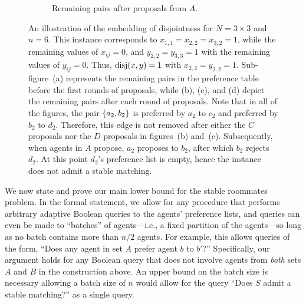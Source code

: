 \begin{figure}[p]
\begin{subfigure}{0.45\textwidth}
\begin{center}
\begin{tikzpicture}
            \end{tikzpicture}
        \end{center}
        \caption{Remaining pairs after proposals from $A$.}
    \end{subfigure}
    \caption{An illustration of the embedding of disjointness for $N = 3 \times 3$ and $n = 6$. This instance corresponds to $x_{1,1} = x_{2,2} = x_{3, 2} = 1$, while the remaining values of $x_{ij} = 0$, and $y_{2,2} = y_{3,3} = 1$ with the remaining values of $y_{ij} = 0$. Thus, $\disj(x, y) = 1$ with $x_{2,2} = y_{2,2} = 1$. Sub-figure~(a) represents the remaining pairs in the preference table before the first rounds of proposals, while (b), (c), and (d) depict the remaining pairs after each round of proposals. Note that in all of the figures, the pair $\set{a_2, b_2}$ is preferred by $a_2$ to $c_2$ and preferred by $b_2$ to $d_2$. Therefore, this edge is not removed after either the $C$ proposals nor the $D$ proposals in figures~(b) and~(c). Subsequently, when agents in $A$ propose, $a_2$ proposes to $b_2$, after which $b_2$ rejects $d_2$. At this point $d_2$'s preference list is empty, hence the instance does not admit a stable matching.}
    \label{fig:intersecting}
\end{figure}


We now state and prove our main lower bound for the stable roommates problem. In the formal statement, we allow for any procedure that performs arbitrary adaptive Boolean queries to the agents' preference lists, and queries can even be made to ``batches'' of agents---i.e., a fixed partition of the agents---so long as no batch contains more than $n/2$ agents. For example, this allows queries of the form, ``Does any agent in set $A$ prefer agent $b$ to $b'$?'' Specifically, our argument holds for any Boolean query that does not involve agents from \emph{both} sets $A$ and $B$ in the construction above. An upper bound on the batch size is necessary allowing a batch size of $n$ would allow for the query ``Does $S$ admit a stable matching?'' as a single query.

